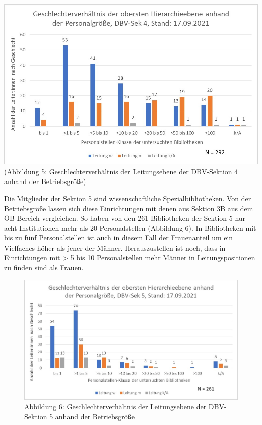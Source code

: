 \documentclass[a4paper,
fontsize=11pt,
oneside,
numbers=noperiodatend,
parskip=half-,
bibliography=totoc,
final
]{scrartcl}
\begin{document}
\includegraphics{img/Abb.05_DBV-Sek4.jpg}(Abbildung 5:
Geschlechterverhältnis der Leitungsebene der DBV-Sektion 4 anhand der
Betriebsgröße)

Die Mitglieder der Sektion 5 sind wissenschaftliche Spezialbibliotheken.
Von der Betriebsgröße lassen sich diese Einrichtungen mit denen aus
Sektion 3B aus dem ÖB-Bereich vergleichen. So haben von den 261
Bibliotheken der Sektion 5 nur acht Institutionen mehr als 20
Personalstellen (Abbildung 6). In Bibliotheken mit bis zu fünf
Personalstellen ist auch in diesem Fall der Frauenanteil um ein
Vielfaches höher als jener der Männer. Herauszustellen ist noch, dass in
Einrichtungen mit \textgreater{} 5 bis 10 Personalstellen mehr Männer in
Leitungspositionen zu finden sind als Frauen.

\begin{figure}
\centering
\includegraphics{img/Abb.06_DBV-Sek5.jpg}
\caption{Abbildung 6: Geschlechterverhältnis der Leitungsebene der
DBV-Sektion 5 anhand der Betriebsgröße}
\end{figure}
\end{document}
